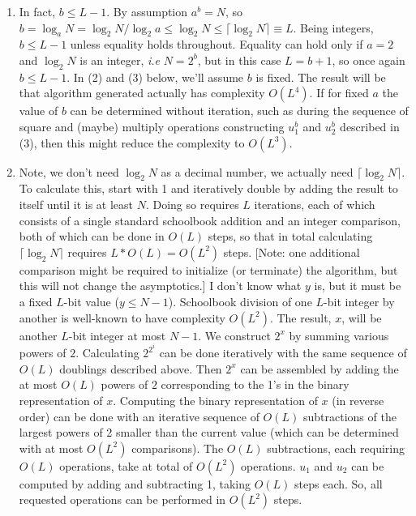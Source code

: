 \begin{enumerate}[label=(\arabic*)]
\item In fact, $b \leq L-1$.  By assumption $a^b = N$, so $b = \log_a N = \log_2 N/\log_2 a \leq \log_2 N \leq \lceil \log_2 N\rceil \equiv L$.  Being integers, $b \leq L - 1$ unless equality holds throughout.  Equality can hold only if $a=2$ and $\log_2 N$ is an integer, \textit{i.e} $N=2^b$, but in this case $L=b+1$, so once again $b \leq L-1$.  In (2) and (3) below, we'll assume $b$ is fixed. The result will be that algorithm generated actually has complexity $O(L^4)$.  If for fixed $a$ the value of $b$ can be determined without iteration, such as during the sequence of square and (maybe) multiply operations constructing $u_1^b$ and $u_2^b$ described in (3), then this might reduce the complexity to $O(L^3)$.
\item Note, we don't need $\log_2 N$ as a decimal number, we actually need $\lceil \log_2 N\rceil$.  To calculate this, start with 1 and iteratively double by adding the result to itself until it is at least $N$.  Doing so requires $L$ iterations, each of which consists of a single standard schoolbook addition and an integer comparison, both of which can be done in $O(L)$ steps, so that in total calculating $\lceil \log_2 N\rceil$ requires $L*O(L)=O(L^2)$ steps.  [Note: one additional comparison might be required to initialize (or terminate) the algorithm, but this will not change the asymptotics.]  I don't know what $y$ is, but it must be a fixed $L$-bit value ($y\leq N-1$).  Schoolbook division of one $L$-bit integer by another is well-known to have complexity $O(L^2)$.  The result, $x$, will be another $L$-bit integer at most $N-1$.  We construct $2^x$ by summing various powers of $2$.  Calculating $2^{2^i}$ can be done iteratively with the same sequence of $O(L)$ doublings described above.  Then $2^x$ can be assembled by adding the at most $O(L)$ powers of $2$ corresponding to the 1's in the binary representation of $x$.  Computing the binary representation of $x$ (in reverse order) can be done with an iterative sequence of $O(L)$ subtractions of the largest powers of 2 smaller than the current value (which can be determined with at most $O(L^2)$ comparisons).  The $O(L)$ subtractions, each requiring $O(L)$ operations, take at total of $O(L^2)$ operations.  $u_1$ and $u_2$ can be computed by adding and subtracting 1, taking $O(L)$ steps each.  So, all requested operations can be performed in $O(L^2)$ steps.

\end{enumerate}
